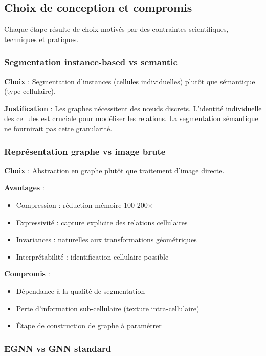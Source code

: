 \subsection{Choix de conception et compromis}

Chaque étape résulte de choix motivés par des contraintes scientifiques, techniques et pratiques.

\subsubsection{Segmentation instance-based vs semantic}

\textbf{Choix} : Segmentation d'instances (cellules individuelles) plutôt que sémantique (type cellulaire).

\textbf{Justification} : Les graphes nécessitent des nœuds discrets. L'identité individuelle des cellules est cruciale pour modéliser les relations. La segmentation sémantique ne fournirait pas cette granularité.

\subsubsection{Représentation graphe vs image brute}

\textbf{Choix} : Abstraction en graphe plutôt que traitement d'image directe.

\textbf{Avantages} :
\begin{itemize}
    \item Compression : réduction mémoire 100-200×
    \item Expressivité : capture explicite des relations cellulaires
    \item Invariances : naturelles aux transformations géométriques
    \item Interprétabilité : identification cellulaire possible
\end{itemize}

\textbf{Compromis} :
\begin{itemize}
    \item Dépendance à la qualité de segmentation
    \item Perte d'information sub-cellulaire (texture intra-cellulaire)
    \item Étape de construction de graphe à paramétrer
\end{itemize}

\subsubsection{EGNN vs GNN standard}

